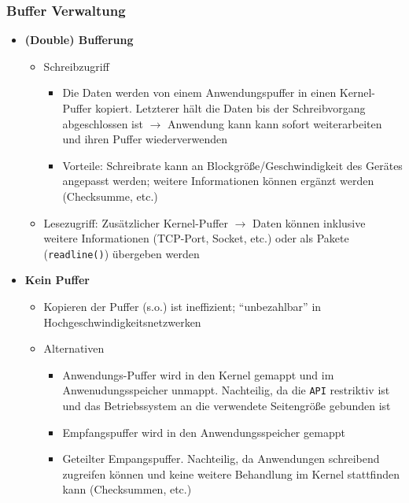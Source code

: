 \subsubsection{Buffer Verwaltung}
\begin{itemize}
	\item \textbf{(Double) Bufferung}
	\begin{itemize}
		\item Schreibzugriff
		\begin{itemize}
			\item Die Daten werden von einem Anwendungspuffer in einen Kernel-Puffer kopiert. Letzterer hält die Daten bis der Schreibvorgang abgeschlossen ist \(\rightarrow\) Anwendung kann kann sofort weiterarbeiten und ihren Puffer wiederverwenden
			\item Vorteile: Schreibrate kann an Blockgröße/Geschwindigkeit des Gerätes angepasst werden; weitere Informationen können ergänzt werden (Checksumme, etc.)
		\end{itemize}
		\item Lesezugriff: Zusätzlicher Kernel-Puffer \(\rightarrow\) Daten können inklusive weitere Informationen (TCP-Port, Socket, etc.) oder als Pakete (\texttt{readline()}) übergeben werden
	\end{itemize}
	\item \textbf{Kein Puffer}
	\begin{itemize}
		\item Kopieren der Puffer (s.o.) ist ineffizient; "`unbezahlbar"' in Hochgeschwindigkeitsnetzwerken
		\item Alternativen
		\begin{itemize}
			\item Anwendungs-Puffer wird in den Kernel gemappt und im Anwenudungsspeicher unmappt. Nachteilig, da die \texttt{API} restriktiv ist und das Betriebssystem an die verwendete Seitengröße gebunden ist
			\item Empfangspuffer wird in den Anwendungsspeicher gemappt
			\item Geteilter Empangspuffer. Nachteilig, da Anwendungen schreibend zugreifen können und keine weitere Behandlung im Kernel stattfinden kann (Checksummen, etc.)
		\end{itemize} 
	\end{itemize}
\end{itemize}

